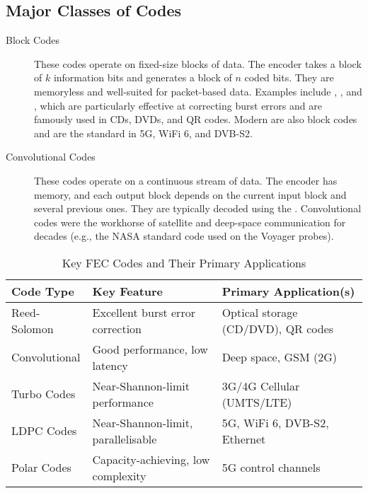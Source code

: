 \subsection{Major Classes of Codes}

\begin{description}
    \item[Block Codes] These codes operate on fixed-size blocks of data. The encoder takes a block of $k$ information bits and generates a block of $n$ coded bits. They are memoryless and well-suited for packet-based data. Examples include , , and , which are particularly effective at correcting burst errors and are famously used in CDs, DVDs, and QR codes. Modern  are also block codes and are the standard in 5G, WiFi 6, and DVB-S2.
    \item[Convolutional Codes] These codes operate on a continuous stream of data. The encoder has memory, and each output block depends on the current input block and several previous ones. They are typically decoded using the . Convolutional codes were the workhorse of satellite and deep-space communication for decades (e.g., the NASA standard code used on the Voyager probes).
\end{description}

\begin{table}[H]
    \centering
    \caption{Key FEC Codes and Their Primary Applications}
    \label{tab:fec-applications}
    \begin{tabular}{@{}lll@{}}
        \toprule
        \tableheaderfont Code Type & \tableheaderfont Key Feature & \tableheaderfont Primary Application(s) \\
        \midrule
        Reed-Solomon & Excellent burst error correction & Optical storage (CD/DVD), QR codes \\
        Convolutional & Good performance, low latency & Deep space, GSM (2G) \\
        Turbo Codes & Near-Shannon-limit performance & 3G/4G Cellular (UMTS/LTE) \\
        LDPC Codes & Near-Shannon-limit, parallelisable & 5G, WiFi 6, DVB-S2, Ethernet \\
        Polar Codes & Capacity-achieving, low complexity & 5G control channels \\
        \bottomrule
    \end{tabular}
\end{table}


